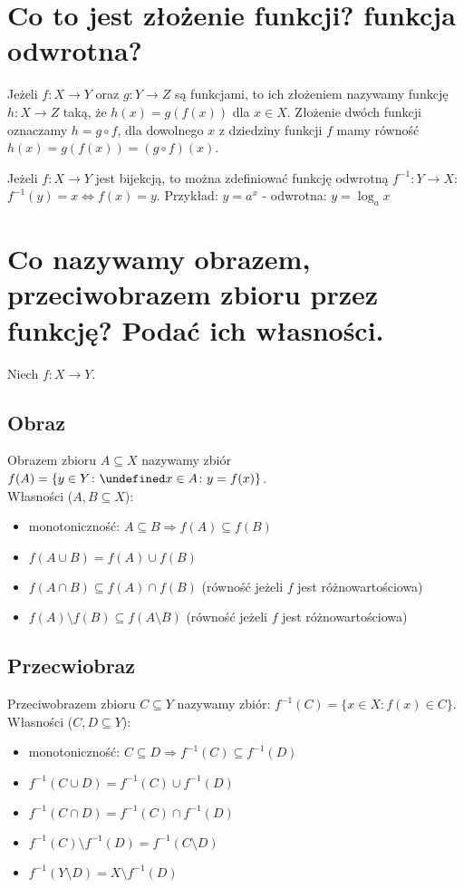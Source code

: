\documentclass{article}
\numberwithin{equation}{section}
\theoremstyle{definition}
\theoremstyle{case}
\let\implies\Rightarrow
\let\iff\Leftrightarrow
\let\oldexists\exists
\let\exists\undefined
\DeclareMathOperator{\exists}{\mkern2mu\oldexists}
\begin{document}
\section{Co to jest złożenie funkcji? funkcja odwrotna?}
Jeżeli $f \colon X \to Y$ oraz $g \colon Y \to Z$ są funkcjami, to ich złożeniem nazywamy funkcję $h \colon X \to Z$ taką, że ${h(x) = g(f(x))}$ dla $x \in X$. Złożenie dwóch funkcji oznaczamy $h=g \circ f$, dla dowolnego $x$ z dziedziny funkcji $f$ mamy równość $h(x)=g(f(x))=(g \circ f)(x)$.

Jeżeli $f \colon X \to Y$ jest bijekcją, to można zdefiniować funkcję odwrotną $f^{-1} \colon Y \to X$:
${f^{-1}(y)=x \iff f(x)=y}$.
Przykład: $y=a^x$ - odwrotna: $y = \log_a{x}$

\section{Co nazywamy obrazem, przeciwobrazem zbioru przez funkcję? Podać ich własności.}
Niech $f \colon X \to Y$.
\subsection{Obraz}
Obrazem zbioru $A \subseteq X$ nazywamy zbiór ${f(A) = \{y \in Y \colon \exists x \in A \colon y=f(x)\}}$.
\\Własności ($A, B \subseteq X$):
\begin{itemize}
	\item monotoniczność: $A \subseteq B \implies f(A) \subseteq f(B)$
	\item $f(A \cup B) = f(A) \cup f(B)$
	\item $f(A \cap B) \subseteq f(A) \cap f(B)$ (równość jeżeli $f$ jest różnowartościowa)
	\item $f(A)\setminus f(B) \subseteq f(A \setminus B)$ (równość jeżeli $f$ jest różnowartościowa)
\end{itemize}

\subsection{Przecwiobraz}
Przeciwobrazem zbioru $C \subseteq Y$ nazywamy zbiór: ${f^{-1}(C) = \{ x \in X \colon f(x) \in C \}}$.
\\Własności ($C, D \subseteq Y$):
\begin{itemize}
	\item monotoniczność: $C \subseteq D \implies f^{-1}(C) \subseteq f^{-1}(D)$
	\item $f^{-1}(C \cup D) = f^{-1}(C) \cup f^{-1}(D)$
	\item $f^{-1}(C \cap D) = f^{-1}(C) \cap f^{-1}(D)$
	\item $f^{-1}(C) \setminus f^{-1}(D) = f^{-1}(C \setminus D)$
	\item $f^{-1}(Y \setminus D) = X \setminus f^{-1}(D)$
\end{itemize}
\end{document}

